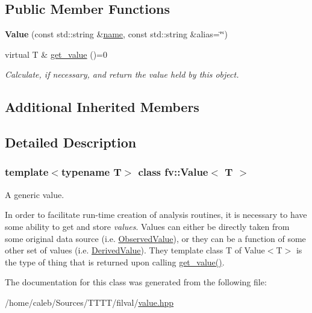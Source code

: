 \subsection*{Public Member Functions}
\begin{DoxyCompactItemize}
\item 
\hypertarget{classfv_1_1Value_afded92c24f946c1551c1f1b005f31091}{}\label{classfv_1_1Value_afded92c24f946c1551c1f1b005f31091} 
{\bfseries Value} (const std\+::string \&\hyperlink{classfv_1_1GenValue_a610f89ee441eaad4c9e78f74d6bde93b}{name}, const std\+::string \&alias=\char`\"{}\char`\"{})
\item 
\hypertarget{classfv_1_1Value_a4cc70444ceaf5d7651922adf9b7beeff}{}\label{classfv_1_1Value_a4cc70444ceaf5d7651922adf9b7beeff} 
virtual T \& \hyperlink{classfv_1_1Value_a4cc70444ceaf5d7651922adf9b7beeff}{get\+\_\+value} ()=0
\begin{DoxyCompactList}\small\item\em Calculate, if necessary, and return the value held by this object. \end{DoxyCompactList}\end{DoxyCompactItemize}
\subsection*{Additional Inherited Members}


\subsection{Detailed Description}
\subsubsection*{template$<$typename T$>$\newline
class fv\+::\+Value$<$ T $>$}

A generic value. 

In order to facilitate run-\/time creation of analysis routines, it is necessary to have some ability to get and store {\itshape values}. Values can either be directly taken from some original data source (i.\+e. \hyperlink{classfv_1_1ObservedValue}{Observed\+Value}), or they can be a function of some other set of values (i.\+e. \hyperlink{classfv_1_1DerivedValue}{Derived\+Value}). They template class T of Value$<$\+T$>$ is the type of thing that is returned upon calling \hyperlink{classfv_1_1Value_a4cc70444ceaf5d7651922adf9b7beeff}{get\+\_\+value()}. 

The documentation for this class was generated from the following file\+:\begin{DoxyCompactItemize}
\item 
/home/caleb/\+Sources/\+T\+T\+T\+T/filval/\hyperlink{value_8hpp}{value.\+hpp}\end{DoxyCompactItemize}

